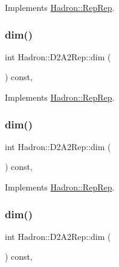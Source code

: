 Implements \mbox{\hyperlink{structHadron_1_1RepRep_a92c8802e5ed7afd7da43ccfd5b7cd92b}{Hadron\+::\+Rep\+Rep}}.

\mbox{\label{structHadron_1_1D2A2Rep_a3ac73e94eff9828876d64a771f037bb5}} 
\subsubsection{\texorpdfstring{dim()}{dim()}\hspace{0.1cm}{\footnotesize\ttfamily [3/5]}}
{\footnotesize\ttfamily int Hadron\+::\+D2\+A2\+Rep\+::dim (\begin{DoxyParamCaption}{ }\end{DoxyParamCaption}) const\hspace{0.3cm}{\ttfamily [inline]}, {\ttfamily [virtual]}}



Implements \mbox{\hyperlink{structHadron_1_1RepRep_a92c8802e5ed7afd7da43ccfd5b7cd92b}{Hadron\+::\+Rep\+Rep}}.

\mbox{\label{structHadron_1_1D2A2Rep_a3ac73e94eff9828876d64a771f037bb5}} 
\subsubsection{\texorpdfstring{dim()}{dim()}\hspace{0.1cm}{\footnotesize\ttfamily [4/5]}}
{\footnotesize\ttfamily int Hadron\+::\+D2\+A2\+Rep\+::dim (\begin{DoxyParamCaption}{ }\end{DoxyParamCaption}) const\hspace{0.3cm}{\ttfamily [inline]}, {\ttfamily [virtual]}}



Implements \mbox{\hyperlink{structHadron_1_1RepRep_a92c8802e5ed7afd7da43ccfd5b7cd92b}{Hadron\+::\+Rep\+Rep}}.

\mbox{\label{structHadron_1_1D2A2Rep_a3ac73e94eff9828876d64a771f037bb5}} 
\subsubsection{\texorpdfstring{dim()}{dim()}\hspace{0.1cm}{\footnotesize\ttfamily [5/5]}}
{\footnotesize\ttfamily int Hadron\+::\+D2\+A2\+Rep\+::dim (\begin{DoxyParamCaption}{ }\end{DoxyParamCaption}) const\hspace{0.3cm}{\ttfamily [inline]}, {\ttfamily [virtual]}}




